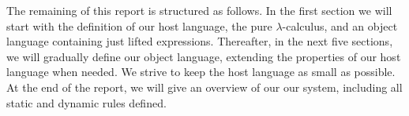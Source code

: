 The remaining of this report is structured as follows.
In the first section we will start with the definition of our host language,
the pure $\lambda$-calculus,
and an object language containing just lifted expressions.
Thereafter, in the next five sections, we will gradually define our object language,
extending the properties of our host language when needed.
We strive to keep the host language as small as possible.
At the end of the report,
we will give an overview of our our system,
including all static and dynamic rules defined.
